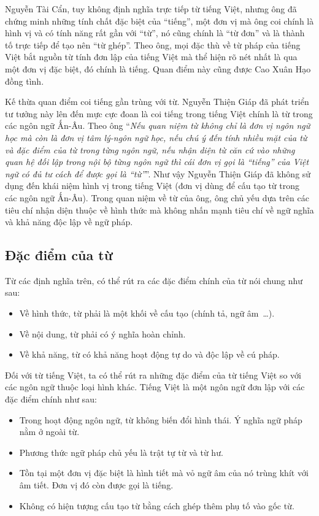 \documentclass[a4paper,oneside,14pt]{extbook} %
\begin{document}
Nguyễn Tài Cẩn, tuy không định nghĩa trực tiếp từ tiếng Việt, nhưng
ông đã chứng minh những tính chất đặc biệt của ``tiếng'', một đơn vị
mà ông coi chính là hình vị và có tính năng rất gần với ``từ'', nó
cũng chính là ``từ đơn'' và là thành tố trực tiếp để tạo nên ``từ
ghép''. Theo ông, mọi đặc thù về từ pháp của tiếng Việt bắt nguồn từ
tính đơn lập của tiếng Việt mà thể hiện rõ nét nhất là qua một đơn vị
đặc biệt, đó chính là tiếng. Quan điểm này cũng được Cao Xuân Hạo đồng
tình. 

Kế thừa quan điểm coi tiếng gần trùng với từ. Nguyễn Thiện Giáp đã
phát triển tư tưởng này lên đến mực cực đoan là coi tiếng trong tiếng
Việt chính là từ trong các ngôn ngữ Ấn-Âu. Theo ông ``\textit{Nếu quan
  niệm từ không chỉ là đơn vị ngôn ngữ học mà còn là đơn vị tâm
  lý-ngôn ngữ học, nếu chú ý đến tính nhiều mặt của từ và đặc điểm của
  từ trong từng ngôn ngữ, nếu nhận diện từ căn cứ vào những quan hệ
  đối lập trong nội bộ từng ngôn ngữ thì cái đơn vị gọi là ``tiếng''
  của Việt ngữ có đủ tư cách để được gọi là ``từ''}''. Như vậy Nguyễn
Thiện Giáp đã không sử dụng đến khái niệm hình vị trong tiếng Việt
(đơn vị dùng để cấu tạo từ trong các ngôn ngữ Ấn-Âu). Trong quan niệm
về từ của ông, ông chủ yếu dựa trên các tiêu chí nhận diện thuộc về
hình thức mà không nhấn mạnh tiêu chí về ngữ nghĩa và khả năng độc lập
về ngữ pháp.

\subsection{Đặc điểm của từ}

Từ các định nghĩa trên, có thể rút ra các đặc điểm chính của từ nói
chung như sau:
\begin{itemize}
\item Về hình thức, từ phải là một khối về cấu tạo (chính tả, ngữ
  âm~\ldots{}).
\item Về nội dung, từ phải có ý nghĩa hoàn chỉnh.
\item Về khả năng, từ có khả năng hoạt động tự do và độc lập về cú
  pháp.
\end{itemize}

Đối với từ tiếng Việt, ta có thể rút ra những đặc điểm của từ tiếng
Việt so với các ngôn ngữ thuộc loại hình khác.
Tiếng Việt là một ngôn ngữ đơn lập với các đặc điểm chính như sau:
\begin{itemize}
\item Trong hoạt động ngôn ngữ, từ không biến đổi hình thái. Ý nghĩa
  ngữ pháp nằm ở ngoài từ. 
\item Phương thức ngữ pháp chủ yếu là trật tự từ và từ hư.
\item Tồn tại một đơn vị đặc biệt là hình tiết mà vỏ ngữ âm của nó
  trùng khít với âm tiết. Đơn vị đó còn được gọi là tiếng.
\item Không có hiện tượng cấu tạo từ bằng cách ghép thêm phụ tố vào
  gốc từ.
\end{itemize}
\end{document}
